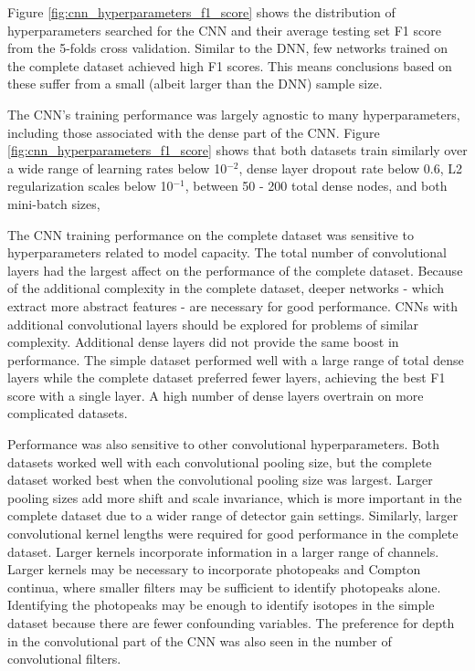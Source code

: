 Figure \ref{fig:cnn_hyperparameters_f1_score} shows the distribution of hyperparameters searched for the CNN and their average testing set F1 score from the 5-folds cross validation. Similar to the DNN, few networks trained on the complete dataset achieved high F1 scores. This means conclusions based on these suffer from a small (albeit larger than the DNN) sample size.

The CNN's training performance was largely agnostic to many hyperparameters, including those associated with the dense part of the CNN. Figure \ref{fig:cnn_hyperparameters_f1_score} shows that both datasets train similarly over a wide range of learning rates below 10$^{-2}$, dense layer dropout rate below 0.6, L2 regularization scales below 10$^{-1}$, between 50 - 200 total dense nodes, and both mini-batch sizes, 

The CNN training performance on the complete dataset was sensitive to hyperparameters related to model capacity. The total number of convolutional layers had the largest affect on the performance of the complete dataset. Because of the additional complexity in the complete dataset, deeper networks - which extract more abstract features - are necessary for good performance. CNNs with additional convolutional layers should be explored for problems of similar complexity. Additional dense layers did not provide the same boost in performance. The simple dataset performed well with a large range of total dense layers while the complete dataset preferred fewer layers, achieving the best F1 score with a single layer. A high number of dense layers overtrain on more complicated datasets. 

Performance was also sensitive to other convolutional hyperparameters. Both datasets worked well with each convolutional pooling size, but the complete dataset worked best when the convolutional pooling size was largest. Larger pooling sizes add more shift and scale invariance, which is more important in the complete dataset due to a wider range of detector gain settings. Similarly, larger convolutional kernel lengths were required for good performance in the complete dataset. Larger kernels incorporate information in a larger range of channels. Larger kernels may be necessary to incorporate photopeaks and Compton continua, where smaller filters may be sufficient to identify photopeaks alone. Identifying the photopeaks may be enough to identify isotopes in the simple dataset because there are fewer confounding variables. The preference for depth in the convolutional part of the CNN was also seen in the number of convolutional filters.

